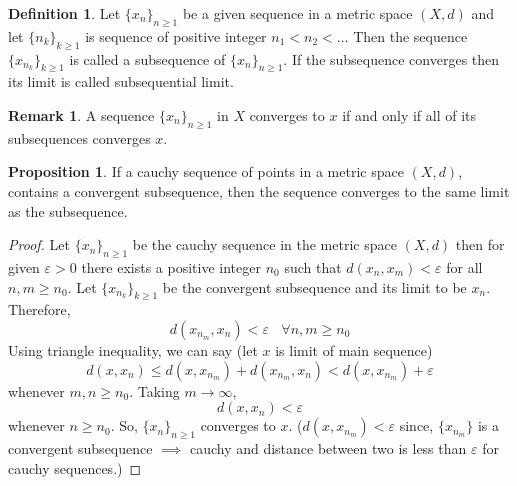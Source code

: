\documentclass[12pt]{report}
\theoremstyle{definition}
\newtheorem{defn}{Definition}
\newtheorem*{rem}{Remark}
\newtheorem{prop}{Proposition}
\begin{document}
\begin{defn}
    Let $\{x_n\}_{n\geq 1}$ be a given sequence in a metric space $(X,d)$ and let $\{n_k\}_{k\geq 1}$ is sequence of positive integer $n_1 < n_2 < \dots$ Then the sequence $\{x_{n_k}\}_{k \geq 1}$ is called a subsequence of $\{x_n\}_{n\geq 1}$. If the subsequence converges then its limit is called subsequential limit. 
\end{defn}
\begin{rem}
    A sequence $\{x_n\}_{n\geq 1}$ in $X$ converges to $x$ if and only if all of its subsequences converges $x$.
\end{rem}
\begin{prop}
    If a cauchy sequence of points in a metric space $(X,d)$, contains a convergent subsequence, then the sequence converges to the same limit as the subsequence.
\end{prop}
\begin{proof}
    Let $\{x_n\}_{n \geq 1}$ be the cauchy sequence in the metric space $(X,d)$ then for given $\varepsilon > 0$ there exists a positive integer $n_0$ such that $d(x_n , x_m) < \varepsilon$ for all $n,m \geq n_0$. Let $\{x_{n_k}\}_{k \geq 1}$ be the convergent subsequence and its limit to be $x_n$. Therefore,
    $$ d(x_{n_m}, x_n) < \varepsilon~~~~\forall n,m \geq n_0$$
    Using triangle inequality, we can say (let $x$ is limit of main sequence)
    $$ d(x,x_n) \leq d(x, x_{n_m}) + d(x_{n_m}, x_n) < d(x, x_{n_m}) + \varepsilon$$ whenever $m,n \geq n_0$. Taking $m \to \infty$,
    $$ d(x, x_n) < \varepsilon$$ whenever $n \geq n_0$. So, $\{x_n\}_{n\geq 1}$ converges to $x$. ($d(x, x_{n_m}) < \varepsilon$ since, $\{x_{n_m}\}$ is a convergent subsequence $\implies$ cauchy and distance between two is less than $\varepsilon$ for cauchy sequences.)
\end{proof}
\end{document}
